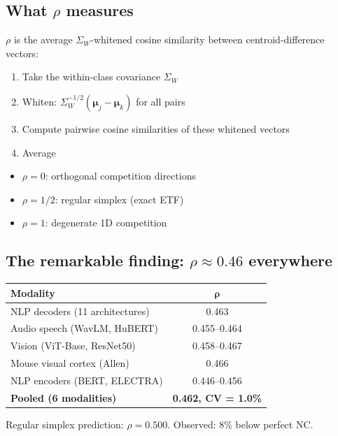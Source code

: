 \documentclass[11pt,a4paper]{article}
\begin{document}
\subsection{What $\rho$ measures}

$\rho$ is the average $\Sigma_W$-whitened cosine similarity between centroid-difference vectors:

\begin{enumerate}[nosep]
\item Take the within-class covariance $\Sigma_W$
\item Whiten: $\Sigma_W^{-1/2}(\boldsymbol{\mu}_j - \boldsymbol{\mu}_k)$ for all pairs
\item Compute pairwise cosine similarities of these whitened vectors
\item Average
\end{enumerate}

\begin{itemize}[nosep]
\item $\rho = 0$: orthogonal competition directions
\item $\rho = 1/2$: regular simplex (exact ETF)
\item $\rho = 1$: degenerate 1D competition
\end{itemize}

\subsection{The remarkable finding: $\rho \approx 0.46$ everywhere}

\begin{resultbox}
\begin{center}
\begin{tabular}{lc}
\toprule
\textbf{Modality} & $\boldsymbol{\rho}$ \\
\midrule
NLP decoders (11 architectures) & 0.463 \\
Audio speech (WavLM, HuBERT) & 0.455--0.464 \\
Vision (ViT-Base, ResNet50) & 0.458--0.467 \\
Mouse visual cortex (Allen) & 0.466 \\
NLP encoders (BERT, ELECTRA) & 0.446--0.456 \\
\midrule
\textbf{Pooled (6 modalities)} & \textbf{0.462, CV = 1.0\%} \\
\bottomrule
\end{tabular}
\end{center}
Regular simplex prediction: $\rho = 0.500$. Observed: 8\% below perfect NC.
\end{resultbox}
\end{document}
